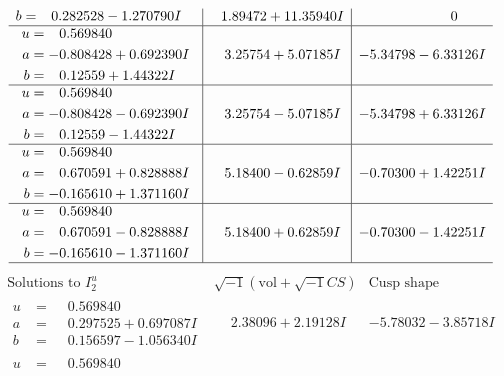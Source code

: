 \documentclass[1p]{elsarticle_modified}
\theoremstyle{definition}
\newcommand{\I}{\sqrt{-1}}
\begin{document}
$$\begin{array}{c|c|c}
\begin{aligned}
b &= \phantom{-}0.282528 - 1.270790 I\end{aligned}
 & \phantom{-}1.89472 + 11.35940 I & \phantom{-0.000000 } 0 \\ \hline\begin{aligned}
u &= \phantom{-}0.569840\phantom{ +0.000000I} \\
a &= -0.808428 + 0.692390 I \\
b &= \phantom{-}0.12559 + 1.44322 I\end{aligned}
 & \phantom{-}3.25754 + 5.07185 I & -5.34798 - 6.33126 I \\ \hline\begin{aligned}
u &= \phantom{-}0.569840\phantom{ +0.000000I} \\
a &= -0.808428 - 0.692390 I \\
b &= \phantom{-}0.12559 - 1.44322 I\end{aligned}
 & \phantom{-}3.25754 - 5.07185 I & -5.34798 + 6.33126 I \\ \hline\begin{aligned}
u &= \phantom{-}0.569840\phantom{ +0.000000I} \\
a &= \phantom{-}0.670591 + 0.828888 I \\
b &= -0.165610 + 1.371160 I\end{aligned}
 & \phantom{-}5.18400 - 0.62859 I & -0.70300 + 1.42251 I \\ \hline\begin{aligned}
u &= \phantom{-}0.569840\phantom{ +0.000000I} \\
a &= \phantom{-}0.670591 - 0.828888 I \\
b &= -0.165610 - 1.371160 I\end{aligned}
 & \phantom{-}5.18400 + 0.62859 I & -0.70300 - 1.42251 I\\
 \hline 
 \end{array}$$\newpage$$\begin{array}{c|c|c}  
\text{Solutions to }I^u_{2}& \I (\text{vol} + \sqrt{-1}CS) & \text{Cusp shape}\\
 \hline 
\begin{aligned}
u &= \phantom{-}0.569840\phantom{ +0.000000I} \\
a &= \phantom{-}0.297525 + 0.697087 I \\
b &= \phantom{-}0.156597 - 1.056340 I\end{aligned}
 & \phantom{-}2.38096 + 2.19128 I & -5.78032 - 3.85718 I \\ \hline\begin{aligned}
u &= \phantom{-}0.569840\phantom{ +0.000000I} \\

\end{aligned}
\end{array}$$
\end{document}
